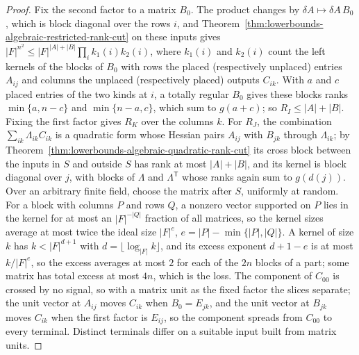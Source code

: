 \begin{proof}
  \leanok
  Fix the second factor to a matrix $B_0$. The product changes by
  $\delta A\mapsto\delta A\,B_0$, which is block diagonal over the rows $i$,
  and Theorem~\ref{thm:lowerbounds-algebraic-restricted-rank-cut} on these
  inputs gives $|F|^{n^2}\le|F|^{|A|+|B|}\prod_i k_1(i)k_2(i)$, where
  $k_1(i)$ and $k_2(i)$ count the left kernels of the blocks of $B_0$ with
  rows the placed (respectively unplaced) entries $A_{ij}$ and columns the
  unplaced (respectively placed) outputs $C_{ik}$. With $a$ and $c$ placed
  entries of the two kinds at $i$, a totally regular $B_0$ gives these blocks
  ranks $\min\{a,n-c\}$ and $\min\{n-a,c\}$, which sum to $g(a+c)$; so
  $R_I\le|A|+|B|$. Fixing the first factor gives $R_K$ over the columns
  $k$. For $R_J$, the combination $\sum_{ik}\Lambda_{ik}C_{ik}$ is a
  quadratic form whose Hessian pairs $A_{ij}$ with $B_{jk}$ through
  $\Lambda_{ik}$; by Theorem~\ref{thm:lowerbounds-algebraic-quadratic-rank-cut}
  its cross block between the inputs in $S$ and outside $S$ has rank at most
  $|A|+|B|$, and its kernel is block diagonal over $j$, with blocks of
  $\Lambda$ and $\Lambda^{\mathsf T}$ whose ranks again sum to $g(d(j))$.
  Over an arbitrary finite field, choose the matrix after $S$, uniformly at
  random. For a block with columns $P$ and rows $Q$, a nonzero vector
  supported on $P$ lies in the kernel for at most an $|F|^{-|Q|}$ fraction
  of all matrices, so the kernel sizes average at most twice the ideal size
  $|F|^e$, $e=|P|-\min\{|P|,|Q|\}$. A kernel of size $k$ has
  $k<|F|^{d+1}$ with $d=\lfloor\log_{|F|}k\rfloor$, and its excess exponent
  $d+1-e$ is at most $k/|F|^e$, so the excess averages at most $2$ for each
  of the $2n$ blocks of a part; some matrix has total excess at most $4n$,
  which is the loss.
  The component of $C_{00}$ is crossed by no signal, so with a matrix unit
  as the fixed factor the slices separate; the unit vector at $A_{ij}$ moves
  $C_{ik}$ when $B_0=E_{jk}$, and the unit vector at $B_{jk}$ moves $C_{ik}$
  when the first factor is $E_{ij}$, so the component spreads from $C_{00}$
  to every terminal. Distinct terminals differ on a suitable input built
  from matrix units.
\end{proof}

